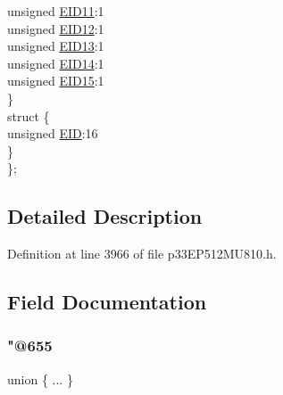 \begin{DoxyCompactItemize}
\begin{tabbing}
\>\>unsigned \hyperlink{structtag_c1_r_x_f4_e_i_d_b_i_t_s_a710bdb0d602deb021b0be99066008018}{EID11}:1\\
\>\>unsigned \hyperlink{structtag_c1_r_x_f4_e_i_d_b_i_t_s_aa347bb85867bd8d4e0124f7cff8c6472}{EID12}:1\\
\>\>unsigned \hyperlink{structtag_c1_r_x_f4_e_i_d_b_i_t_s_a37d5f3edcbf6ef62f848fd4f3c584f79}{EID13}:1\\
\>\>unsigned \hyperlink{structtag_c1_r_x_f4_e_i_d_b_i_t_s_a7ffc0b0e0d99b8476b6f9a45337c17ab}{EID14}:1\\
\>\>unsigned \hyperlink{structtag_c1_r_x_f4_e_i_d_b_i_t_s_a293cd7dc1746257fa75a60cbd9383cd7}{EID15}:1\\
\>\} \\
\>struct \{\\
\>\>unsigned \hyperlink{structtag_c1_r_x_f4_e_i_d_b_i_t_s_ae80b378c9141f7c03e0b4e55b5f4b54d}{EID}:16\\
\>\} \\
\}; \\

\end{tabbing}\end{DoxyCompactItemize}


\subsection{Detailed Description}


Definition at line 3966 of file p33\+E\+P512\+M\+U810.\+h.



\subsection{Field Documentation}
\mbox{\label{structtag_c1_r_x_f4_e_i_d_b_i_t_s_aa9c3402b9c3e8b0afa38863c554dfb63}} 
\subsubsection{\texorpdfstring{"@655}{@655}}
{\footnotesize\ttfamily union \{ ... \} }

\mbox{\label{structtag_c1_r_x_f4_e_i_d_b_i_t_s_ae80b378c9141f7c03e0b4e55b5f4b54d}} 
